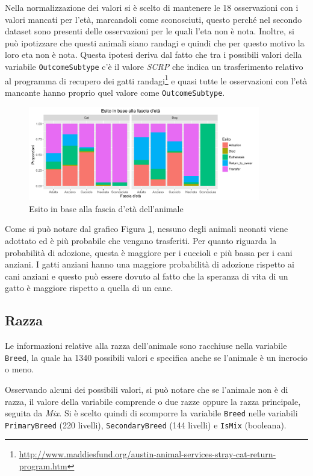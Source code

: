 Nella normalizzazione dei valori si è scelto di mantenere le 18 osservazioni con i valori mancati per l'età, marcandoli come sconosciuti, questo perché nel secondo dataset sono presenti delle osservazioni per le quali l'eta non è nota. Inoltre, si può ipotizzare che questi animali siano randagi e quindi che per questo motivo la loro eta non è nota.
Questa ipotesi deriva dal fatto che tra i possibili valori della variabile \texttt{OutcomeSubtype} c'è il valore \textit{SCRP} che indica un trasferimento relativo al programma di recupero dei gatti randagi\footnote{\url{http://www.maddiesfund.org/austin-animal-services-stray-cat-return-program.htm}} e quasi tutte le osservazioni con l'età mancante hanno proprio quel valore come \texttt{OutcomeSubtype}.

\begin{figure}[htbp]
	\centering
	\includegraphics[width=0.9\textwidth]{./grafici/esito_eta.pdf}
	\caption{Esito in base alla fascia d'età dell'animale}\label{fig-eta}
\end{figure}

Come si può notare dal grafico Figura \ref{fig-eta}, nessuno degli animali neonati viene adottato ed è più probabile che vengano trasferiti. Per quanto riguarda la probabilità di adozione, questa è maggiore per i cuccioli e più bassa per i cani anziani. I gatti anziani hanno una maggiore probabilità di adozione rispetto ai cani anziani e questo può essere dovuto al fatto che la speranza di vita di un gatto è maggiore rispetto a quella di un cane.

\subsection{Razza}

Le informazioni relative alla razza dell'animale sono racchiuse nella variabile \texttt{Breed}, la quale ha 1340 possibili valori e specifica anche se l'animale è un incrocio o meno.

Osservando alcuni dei possibili valori, si può notare che se l'animale non è di razza, il valore della variabile comprende o due razze oppure la razza principale, seguita da \textit{Mix}. Si è scelto quindi di scomporre la variabile \texttt{Breed} nelle variabili \texttt{PrimaryBreed} (220 livelli), \texttt{SecondaryBreed} (144 livelli) e \texttt{IsMix} (booleana).

